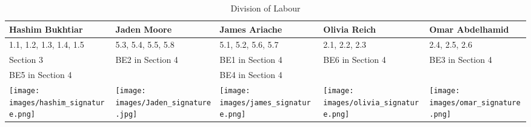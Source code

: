 \documentclass[]{article}
\begin{document}
\begin{table}[h!]
\centering
\begin{tabular}{|p{3cm}|p{3cm}|p{3cm}|p{3cm}|p{3cm}|}
\hline
Hashim Bukhtiar & Jaden Moore & James Ariache & Olivia Reich & Omar Abdelhamid \\ \hline
1.1, 1.2, 1.3, 1.4, 1.5 & 5.3, 5.4, 5.5, 5.8 & 5.1, 5.2, 5.6, 5.7 & 2.1, 2.2, 2.3 & 2.4, 2.5, 2.6 \\ 
Section 3 & BE2 in Section 4 & BE1 in Section 4 & BE6 in Section 4 & BE3 in Section 4 \\ 
BE5 in Section 4 & & BE4 in Section 4 & & \\ \hline
\texttt{[image: images/hashim\_signature.png]} & \texttt{[image: images/Jaden\_signature.jpg]} &
\texttt{[image: images/james\_signature.png]}& \texttt{[image: images/olivia\_signature.png]} & \texttt{[image: images/omar\_signature.png]}  \\ \hline
\end{tabular}
\caption{Division of Labour} 
\label{tab:division_of_labour}
\end{table}


\end{document}

